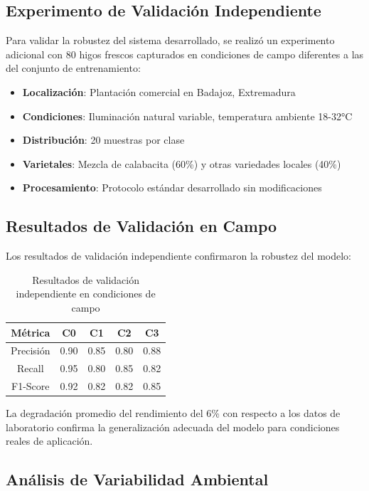 \subsection{Experimento de Validación Independiente}

Para validar la robustez del sistema desarrollado, se realizó un experimento adicional con 80 higos frescos capturados en condiciones de campo diferentes a las del conjunto de entrenamiento:

\begin{itemize}
    \item \textbf{Localización}: Plantación comercial en Badajoz, Extremadura
    \item \textbf{Condiciones}: Iluminación natural variable, temperatura ambiente 18-32°C
    \item \textbf{Distribución}: 20 muestras por clase
    \item \textbf{Varietales}: Mezcla de calabacita (60\%) y otras variedades locales (40\%)
    \item \textbf{Procesamiento}: Protocolo estándar desarrollado sin modificaciones
\end{itemize}

\subsection{Resultados de Validación en Campo}

Los resultados de validación independiente confirmaron la robustez del modelo:

\begin{table}[h!]
\centering
\caption{Resultados de validación independiente en condiciones de campo}
\begin{tabular}{|c|c|c|c|c|}
\hline
\textbf{Métrica} & \textbf{C0} & \textbf{C1} & \textbf{C2} & \textbf{C3} \\
\hline
Precisión & 0.90 & 0.85 & 0.80 & 0.88 \\
\hline
Recall & 0.95 & 0.80 & 0.85 & 0.82 \\
\hline
F1-Score & 0.92 & 0.82 & 0.82 & 0.85 \\
\hline
\end{tabular}
\label{tab:field_validation}
\end{table}

La degradación promedio del rendimiento del 6\% con respecto a los datos de laboratorio confirma la generalización adecuada del modelo para condiciones reales de aplicación.

\subsection{Análisis de Variabilidad Ambiental}

